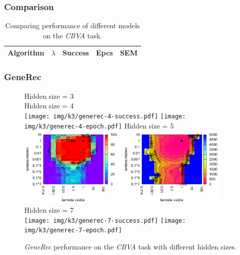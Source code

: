 \subsubsection{Comparison} 
\label{sec:results-cmp-k3} 


\begin{table}
  \centering
    \begin{tabular}{|l|l|l|l|l|}
    \hline
    Algorithm&$\lambda$&Success&Epcs&SEM \\
    \hline
    \end{tabular}
  \caption{Comparing performance of different models on the \emph{CBVA} task.} 
  \label{tab:results-cmp-k3}
\end{table}


\subsubsection{GeneRec} 

\begin{figure}[H]
  \centering
  Hidden size = 3 \\
  Hidden size = 4 \\
  \texttt{[image: img/k3/generec-4-success.pdf]} 
  \texttt{[image: img/k3/generec-4-epoch.pdf]}   
  Hidden size = 5 \\
  \includegraphics[width=0.45\textwidth]{img/k3/generec-5-success.pdf} 
  \includegraphics[width=0.45\textwidth]{img/k3/generec-5-epoch.pdf}  
  Hidden size = 7 \\
  \texttt{[image: img/k3/generec-7-success.pdf]} 
  \texttt{[image: img/k3/generec-7-epoch.pdf]}    
  \caption{\emph{GeneRec} performance on the \emph{CBVA} task with different hidden sizes.}
  \label{fig:results-generec-k3-success}
\end{figure}


